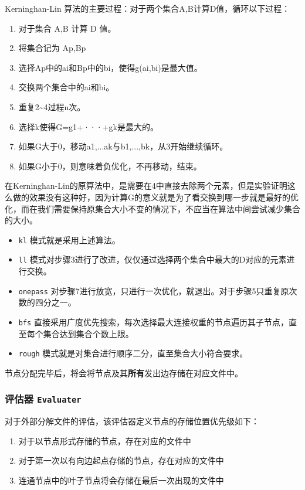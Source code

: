 \documentclass[
]{article}
\begin{document}
Kerninghan-Lin 算法的主要过程：对于两个集合A,B计算D值，循环以下过程：

\begin{enumerate}
\def\labelenumi{\arabic{enumi}.}
\item
  对于集合 A,B 计算 D 值。
\item
  将集合记为 Ap,Bp
\item
  选择Ap中的ai和Bp中的bi，使得g(ai,bi)是最大值。
\item
  交换两个集合中的ai和bi。
\item
  重复2\textasciitilde4过程n次。
\item
  选择k使得G=g1+···+gk是最大的。
\item
  如果G大于0，移动a1,...ak与b1,...,bk，从3开始继续循环。
\item
  如果G小于0，则意味着负优化，不再移动，结束。
\end{enumerate}

在Kerninghan-Lin的原算法中，是需要在4中直接去除两个元素，但是实验证明这么做的效果没有这种好，因为计算G的意义就是为了看交换到哪一步就是最好的优化，而在我们需要保持原集合大小不变的情况下，不应当在算法中间尝试减少集合的大小。

\begin{itemize}
\item
  \texttt{kl} 模式就是采用上述算法。
\item
  \texttt{ll}
  模式对步骤3进行了改进，仅仅通过选择两个集合中最大的D对应的元素进行交换。
\item
  \texttt{onepass}
  对步骤7进行放宽，只进行一次优化，就退出。对于步骤5只重复原次数的四分之一。
\item
  \texttt{bfs}
  直接采用广度优先搜索，每次选择最大连接权重的节点遍历其子节点，直至每个集合达到集合个数上限。
\item
  \texttt{rough} 模式就是对集合进行顺序二分，直至集合大小符合要求。
\end{itemize}

节点分配完毕后，将会将节点及其\textbf{所有}发出边存储在对应文件中。

\hypertarget{header-n185}{%
\subsubsection{\texorpdfstring{评估器
\texttt{Evaluater}}{评估器 Evaluater}}\label{header-n185}}

对于外部分解文件的评估，该评估器定义节点的存储位置优先级如下：

\begin{enumerate}
\def\labelenumi{\arabic{enumi}.}
\item
  对于以节点形式存储的节点，存在对应的文件中
\item
  对于第一次以有向边起点存储的节点，存在对应的文件中
\item
  连通节点中的叶子节点将会存储在最后一次出现的文件中
\end{enumerate}
\end{document}
